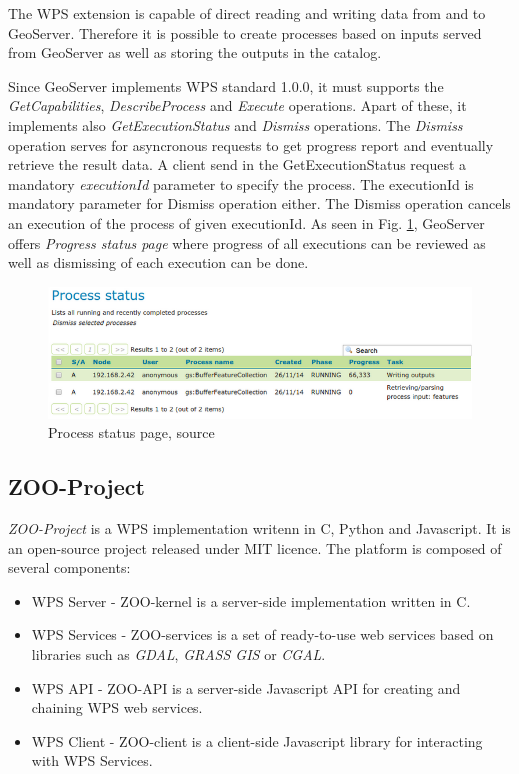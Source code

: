 \documentclass[12pt,a4paper]{article}
\begin{document}
The WPS extension is capable of direct reading and writing data from and to GeoServer. Therefore it is possible to create processes
based on inputs served from GeoServer as well as storing the outputs in the catalog.

Since GeoServer implements WPS standard 1.0.0, it must supports the \textit{GetCapabilities}, \textit{DescribeProcess} and \textit{Execute}
operations. Apart of these, it implements also \textit{GetExecutionStatus} and \textit{Dismiss} operations. The \textit{Dismiss} operation
serves for asyncronous requests to get progress report and eventually retrieve the result data. A client send in the GetExecutionStatus
request a mandatory \textit{executionId} parameter to specify the process. The executionId is mandatory parameter for Dismiss operation
either. The Dismiss operation cancels an execution of the process of given executionId. As seen in Fig. \ref{fig:geoserver_status},
GeoServer offers \textit{Progress status page} where progress of all executions can be reviewed as well as dismissing of each execution
can be done.

\begin{figure}[h!]
\centering
\includegraphics[width=\textwidth]{img/geoserver_status.png}
\caption{Process status page, source \cite{GS_docs}}
\label{fig:geoserver_status}
\end{figure}

\subsection{ZOO-Project}
\textit{ZOO-Project} is a WPS implementation writenn in C, Python and Javascript. It is an open-source project released under MIT licence.
The platform is composed of several components:

\begin{itemize}
\item WPS Server - ZOO-kernel is a server-side implementation written in C.
\item WPS Services - ZOO-services is a set of ready-to-use web services based on libraries such as \textit{GDAL}, \textit{GRASS GIS}
or \textit{CGAL}.
\item WPS API - ZOO-API is a server-side Javascript API for creating and chaining WPS web services.
\item WPS Client - ZOO-client is a client-side Javascript library for interacting with WPS Services.
\end{itemize}
\end{document}
